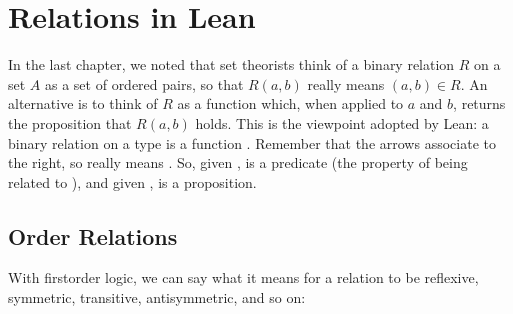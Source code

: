 \documentclass[letterpaper,10pt,english]{sphinxmanual}
\begin{document}
\chapter{Relations in Lean}
\label{\detokenize{relations_in_lean:relations-in-lean}}\label{\detokenize{relations_in_lean::doc}}
\sphinxAtStartPar
In the last chapter, we noted that set theorists think of a binary relation
\(R\) on a set \(A\) as a set of ordered pairs,
so that \(R(a, b)\) really means \((a, b) \in R\).
An alternative is to think of \(R\) as a function which,
when applied to \(a\) and \(b\),
returns the proposition that \(R(a, b)\) holds.
This is the viewpoint adopted by Lean:
a binary relation on a type  is a function .
Remember that the arrows associate to the right,
so  really means .
So, given ,
 is a predicate (the property of being related to ),
and given ,  is a proposition.


\section{Order Relations}
\label{\detokenize{relations_in_lean:order-relations}}
\sphinxAtStartPar
With first\sphinxhyphen{}order logic,
we can say what it means for a relation to be reflexive,
symmetric, transitive, antisymmetric, and so on:
\end{document}
